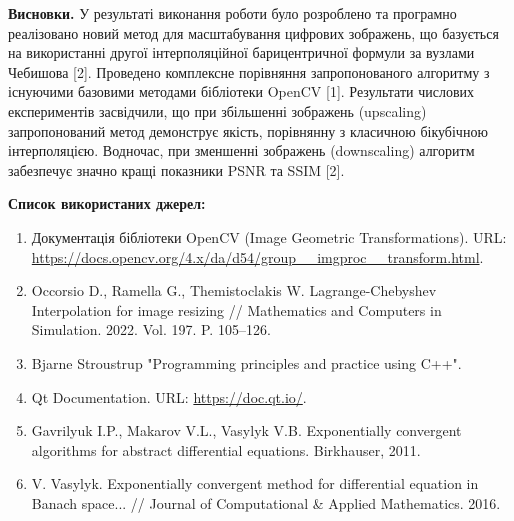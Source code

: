 \textbf{Висновки.} 
У результаті виконання роботи було розроблено та програмно реалізовано новий метод для масштабування цифрових зображень, що базується на використанні другої інтерполяційної барицентричної формули за вузлами Чебишова [2]. Проведено комплексне порівняння запропонованого алгоритму з існуючими базовими методами бібліотеки OpenCV [1].
Результати числових експериментів засвідчили, що при збільшенні зображень (upscaling) запропонований метод демонструє якість, порівнянну з класичною бікубічною інтерполяцією. Водночас, при зменшенні зображень (downscaling) алгоритм забезпечує значно кращі показники PSNR та SSIM [2].

\newpage
\noindent \textbf{Список використаних джерел:}
\begin{enumerate}
	\setlength{\itemsep}{0pt}
	\item Документація бібліотеки OpenCV (Image Geometric Transformations). URL: \url{https://docs.opencv.org/4.x/da/d54/group__imgproc__transform.html}.
	\item Occorsio D., Ramella G., Themistoclakis W. Lagrange-Chebyshev Interpolation for image resizing // Mathematics and Computers in Simulation. 2022. Vol. 197. P. 105–126.
	\item Bjarne Stroustrup "Programming principles and practice using C++".
	\item Qt Documentation. URL: \url{https://doc.qt.io/}.
	\item Gavrilyuk I.P., Makarov V.L., Vasylyk V.B. Exponentially convergent algorithms for abstract differential equations. Birkhauser, 2011.
	\item V. Vasylyk. Exponentially convergent method for differential equation in Banach space... // Journal of Computational \& Applied Mathematics. 2016.
\end{enumerate}
